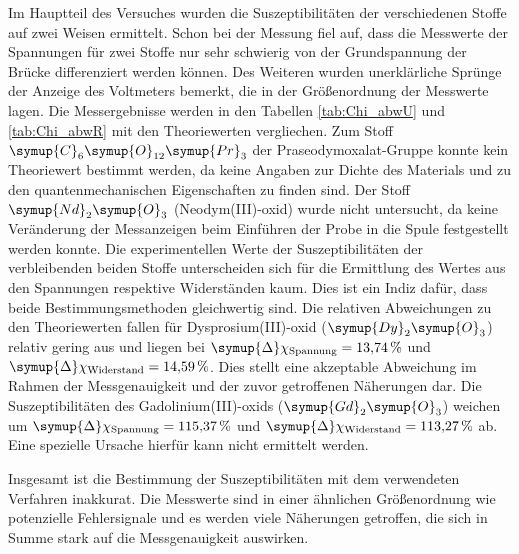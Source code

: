 Im Hauptteil des Versuches wurden die Suszeptibilitäten der verschiedenen Stoffe auf zwei Weisen ermittelt. Schon bei der Messung fiel auf, dass die Messwerte
der Spannungen für zwei Stoffe nur sehr schwierig von der Grundspannung der Brücke differenziert werden können. Des Weiteren wurden unerklärliche Sprünge der
Anzeige des Voltmeters bemerkt, die in der Größenordnung der Messwerte lagen. Die Messergebnisse werden in den Tabellen \ref{tab:Chi_abwU} und \ref{tab:Chi_abwR}
mit den Theoriewerten vergliechen. Zum Stoff $\symup{C}_6\symup{O}_{12}\symup{Pr}_3$ der Praseodymoxalat-Gruppe konnte kein Theoriewert bestimmt werden, da
keine Angaben zur Dichte des Materials und zu den quantenmechanischen Eigenschaften zu finden sind. Der Stoff $\symup{Nd}_2\symup{O}_3$ (Neodym(III)-oxid)
wurde nicht untersucht, da keine Veränderung der Messanzeigen beim Einführen der Probe in die Spule festgestellt werden konnte. Die experimentellen Werte
der Suszeptibilitäten der verbleibenden beiden Stoffe unterscheiden sich für die Ermittlung des Wertes aus den Spannungen respektive Widerständen kaum.
Dies ist ein Indiz dafür, dass beide Bestimmungsmethoden gleichwertig sind. Die relativen Abweichungen zu den Theoriewerten fallen für Dysprosium(III)-oxid
($\symup{Dy}_2\symup{O}_3$) relativ gering aus und liegen bei $\symup{\Delta}\chi_\text{Spannung} = \qty{13.74}{\percent}$ und
$\symup{\Delta}\chi_\text{Widerstand} = \qty{14.59}{\percent}$. Dies stellt eine akzeptable Abweichung im Rahmen der Messgenauigkeit und der zuvor getroffenen 
Näherungen dar. Die Suszeptibilitäten des Gadolinium(III)-oxids ($\symup{Gd}_2\symup{O}_3$) weichen um $\symup{\Delta}\chi_\text{Spannung} = \qty{115.37}{\percent}$
und $\symup{\Delta}\chi_\text{Widerstand} = \qty{113.27}{\percent}$ ab. Eine spezielle Ursache hierfür kann nicht ermittelt werden. 

Insgesamt ist die Bestimmung der Suszeptibilitäten mit dem verwendeten Verfahren inakkurat. Die Messwerte sind in einer ähnlichen Größenordnung wie potenzielle
Fehlersignale und es werden viele Näherungen getroffen, die sich in Summe stark auf die Messgenauigkeit auswirken. 
